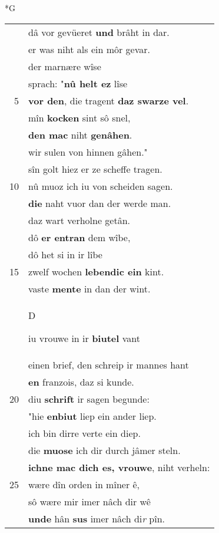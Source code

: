 \documentclass[8pt,a4paper,notitlepage]{article}
\begin{document}
\begin{table}[ht]
\begin{minipage}[t]{0.5\linewidth}
\small
\begin{center}*G
\end{center}
\begin{tabular}{rl}
 & dâ vor gevüeret \textbf{und} brâht in dar.\\ 
 & er was niht als ein môr gevar.\\ 
 & der marnære wîse\\ 
 & sprach: "\textbf{nû helt ez} lîse\\ 
5 & \textbf{vor den}, die tragent \textbf{daz swarze vel}.\\ 
 & mîn \textbf{kocken} sint sô snel,\\ 
 & \textbf{den mac} niht \textbf{genâhen}.\\ 
 & wir sulen von hinnen gâhen."\\ 
 & sîn golt hiez er ze scheffe tragen.\\ 
10 & nû muoz ich iu von scheiden sagen.\\ 
 & \textbf{die} naht vuor dan der werde man.\\ 
 & daz wart verholne getân.\\ 
 & dô \textbf{er entran} dem wîbe,\\ 
 & dô het si in ir lîbe\\ 
15 & zwelf wochen \textbf{lebendic ein} kint.\\ 
 & vaste \textbf{mente} in dan der wint.\\ 
 & \begin{large}D\end{large}iu vrouwe in ir \textbf{biutel} vant\\ 
 & einen brief, den schreip ir mannes hant\\ 
 & \textbf{en} franzois, daz si kunde.\\ 
20 & diu \textbf{schrift} ir sagen begunde:\\ 
 & "hie \textbf{enbiut} liep ein ander liep.\\ 
 & ich bin dirre verte ein diep.\\ 
 & die \textbf{muose} ich dir durch jâmer steln.\\ 
 & \textbf{ichne mac dich es, vrouwe}, niht verheln:\\ 
25 & wære dîn orden in mîner ê,\\ 
 & sô wære mir imer nâch dir wê\\ 
 & \textbf{unde} hân \textbf{sus} imer nâch di\textit{r} pîn.\\ 

\end{tabular}
\end{minipage}
\end{table}
\end{document}
